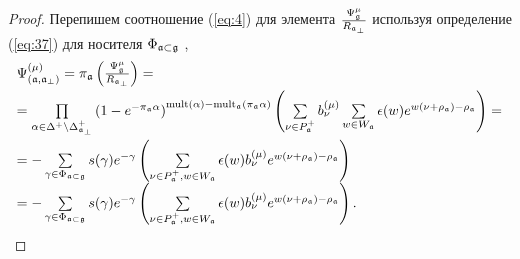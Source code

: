 \begin{proof}
Перепишем соотношение (\ref{eq:4}) для элемента $\frac{\Psi _{\mathfrak{g}}^{\mu }}{R_{\mathfrak{a}_{\perp}}}$ используя определение (\ref{eq:37})
для носителя $\Phi _{\mathfrak{a}\subset \mathfrak{g}}$ ,
\begin{equation*}
\begin{array}{l}
\Psi ^{\left( \mu \right) }_{\left(  \af, \afb \right)}
=\pi _{\af}\left( \frac{\Psi _{\gf}^{\mu }}{R_{\af_{\perp }}}%
\right) = \\[2mm]
=\prod\limits_{\alpha \in \Delta ^{+}\setminus \Delta _{\afb }^{+}}\left(
1-e^{-\pi _{\af}\alpha }\right) ^{\mathrm{mult}(\alpha )-\mathrm{mult}_{%
\af}(\pi _{\af}\alpha )}\left( \sum\limits_{\nu \in P_{\af%
}^{+}}b_{\nu }^{(\mu )}\sum\limits_{w\in W_{\af}}\epsilon (w)e^{w(\nu
+\rho _{\af})-\rho _{\af}}\right) = \\[5mm]
=-\sum\limits_{\gamma \in \Phi _{\af\subset \gf}}s(\gamma
)e^{-\gamma }\left( \sum\limits_{\nu \in P_{\af}^{+},w\in W_{\af%
}}\epsilon (w)b_{\nu }^{(\mu )}e^{w(\nu +\rho _{\af})-\rho _{\af%
}}\right)  \\
=-\sum\limits_{\gamma \in \Phi _{\af\subset \gf}}s(\gamma
)e^{-\gamma }\left( \sum\limits_{\nu \in P_{\af}^{+},w\in W_{\af%
}}\epsilon (w)b_{\nu }^{(\mu )}e^{w(\nu +\rho _{\af})-\rho _{\af%
}}\right) .
\end{array}
\end{equation*}


\end{proof}
